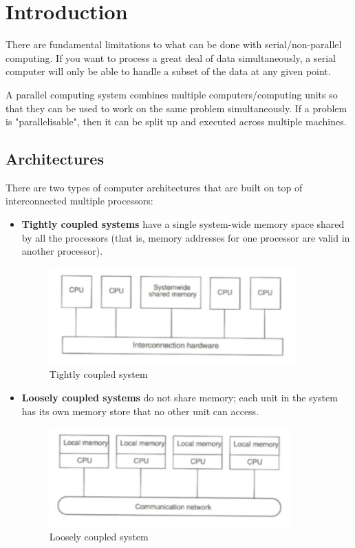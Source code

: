 \chapter{Introduction}
There are fundamental limitations to what can be done with serial/non-parallel computing. If you want to process a great deal of data simultaneously, a serial computer will only be able to handle a subset of the data at any given point.

A parallel computing system combines multiple computers/computing units so that they can be used to work on the same problem simultaneously. If a problem is "parallelisable", then it can be split up and executed across multiple machines.

\section{Architectures}
There are two types of computer architectures that are built on top of interconnected multiple processors:
\begin{itemize}
\item \textbf{Tightly coupled systems} have a single system-wide memory space shared by all the processors (that is, memory addresses for one processor are valid in another processor). \begin{figure}[h]
\centering
\includegraphics[width=0.5\linewidth]{screenshot001}
\caption{Tightly coupled system}

\label{fig:screenshot001}
\end{figure}
\item \textbf{Loosely coupled systems} do not share memory; each unit in the system has its own memory store that no other unit can access. \begin{figure}
\centering
\includegraphics[width=0.7\linewidth]{screenshot002}
\caption{Loosely coupled system}
\label{fig:screenshot002}
\end{figure}

\end{itemize}

